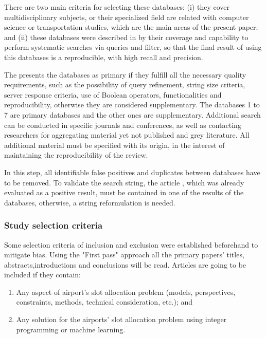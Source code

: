 There are two main criteria for selecting these databases: (i) they cover multidisciplinary subjects, or their specialized field are related with computer science or transportation studies, which are the main areas of the present paper; and (ii) these databases were described in \cite{kitchenham2007guidelines} by their coverage and capability to perform systematic searches via queries and filter, so that the final result of using this databases is a reproducible, with high recall and precision.  

The \cite{gusenbauer2020academic} presents the databases as primary if they fulfill all the necessary quality requirements, such as the possibility of query refinement, string size criteria, server response criteria, use of Boolean operators, functionalities and reproducibility, otherwise they are considered supplementary. The databases 1 to 7 are primary databases and the other ones are supplementary. Additional search can be conducted in specific journals and conferences, as well as contacting researchers for aggregating material yet not published and grey literature. All additional material must be specified with its origin, in the interest of maintaining the reproducibility of the review.

In this step, all identifiable false positives and duplicates between databases have to be removed. To validate the search string, the article \cite{ribeiro2018optimization}, which was already evaluated as a positive result, must be contained in one of the results of the databases, otherwise, a string reformulation is needed.

\subsubsection{Study selection criteria}

Some selection criteria of inclusion and exclusion were established beforehand to mitigate bias. Using the "First pass" approach \cite{keshav2007read} all the primary papers' titles, abstracts,introductions and conclusions will be read. 
Articles are going to be included if they contain: 
\begin{enumerate}
    \item Any aspect of airport's slot allocation problem (models, perspectives, constraints, methods, technical consideration, etc.); and
    \item Any solution for the airports' slot allocation problem using integer programming or machine learning.
\end{enumerate}

